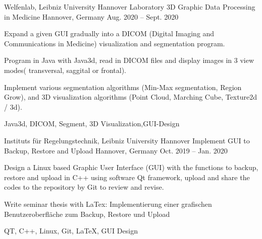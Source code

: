
\begin{cventries}
\cventry
{Welfenlab, Leibniz University Hannover} %
{Laboratory 3D Graphic Data Processing in Medicine} %
{Hannover, Germany} %
{Aug. 2020 – Sept. 2020} %
{
	\begin{cvitems} %
 		\item {Expand a given GUI gradually into a DICOM (Digital Imaging and Communications in Medicine) visualization and segmentation program.}
 		\item {Program in Java with Java3d, read in DICOM files and display images in 3 view modes( transversal, saggital or frontal).}
 		\item{Implement various segmentation algorithms (Min-Max segmentation, Region Grow), and 3D visualization algorithms (Point Cloud, Marching Cube, Texture2d / 3d).}
 	\end{cvitems}
}
{Java3d, DICOM, Segment, 3D Visualization,GUI-Design}


\cventry
{Instituts für Regelungstechnik, Leibniz University Hannover} %
{Implement GUI to Backup, Restore and Upload} %
{Hannover, Germany} %
{Oct. 2019 – Jan. 2020} %
{
	\begin{cvitems} %
		\item {Design a Linux based Graphic User Interface (GUI) with the functions to backup, restore and upload in C++ using software Qt framework, upload and share the codes to the repository by Git to review and revise.}
		\item {Write seminar thesis with LaTex: Implementierung einer grafischen Benutzeroberfläche zum Backup, Restore und Upload}
	\end{cvitems}
	}
{QT, C++, Linux, Git, \LaTeX, GUI Design}


\end{cventries}
